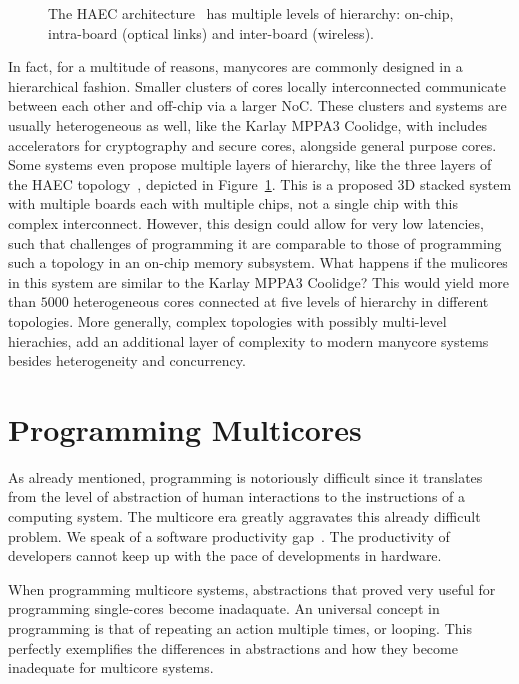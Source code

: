 \begin{figure}[h]
	\centering
   \resizebox{0.5\textwidth}{!}{}
   \caption{The HAEC architecture~\cite{HAEC} has multiple levels of hierarchy: on-chip, intra-board (optical links) and inter-board (wireless).} 
	\label{fig:haec}
\end{figure}

In fact, for a multitude of reasons, manycores are commonly designed in a hierarchical fashion.
Smaller clusters of cores locally interconnected communicate between each other and off-chip via a larger \ac{NoC}.
These clusters and systems are usually heterogeneous as well, like the Karlay MPPA3 Coolidge, with includes accelerators for cryptography and secure cores, alongside general purpose cores.
Some systems even propose multiple layers of hierarchy, like the three layers of the HAEC topology~\cite{HAEC}, depicted in Figure~\ref{fig:haec}.
This is a proposed 3D stacked system with multiple boards each with multiple chips, not a single chip with this complex interconnect.
However, this design could allow for very low latencies, such that challenges of programming it are comparable to those of programming such a topology in an on-chip memory subsystem.
What happens if the mulicores in this system are similar to the Karlay MPPA3 Coolidge? This would yield more than $5000$ heterogeneous cores connected at five levels of hierarchy in different topologies.
More generally, complex topologies with possibly multi-level hierachies, add an additional layer of complexity to modern manycore systems besides heterogeneity and concurrency.

\section{Programming Multicores}

As already mentioned, programming is notoriously difficult since it translates from the level of abstraction of human interactions to the instructions of a computing system.
The multicore era greatly aggravates this already difficult problem.
We speak of a software productivity gap~\cite{castrillon2014thesis,ecker2009hardware}. 
The productivity of developers cannot keep up with the pace of developments in hardware.

When programming multicore systems, abstractions that proved very useful for programming single-cores become inadaquate.
An universal concept in programming is that of repeating an action multiple times, or looping. 
This perfectly exemplifies the differences in abstractions and how they become inadequate for multicore systems.

